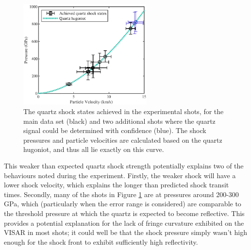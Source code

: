 \begin{figure} [h]
\begin{centering}
\includegraphics[width=0.6\textwidth]{figures/Experiment/QuartzShockStates_edit.eps}%
\caption{\label{fig:QuartzShockStates} The quartz shock states achieved in the experimental shots, for the main data set (black) and two additional shots where the quartz signal could be determined with confidence (blue). The shock pressures and particle velocities are calculated based on the quartz hugoniot, and thus all lie exactly on this curve.}
\end{centering}
\end{figure}

This weaker than expected quartz shock strength potentially explains two of the behaviours noted during the experiment. Firstly, the weaker shock will have a lower shock velocity, which explains the longer than predicted shock transit times. Secondly,  many of the shots in Figure \ref{fig:QuartzShockStates} are at pressures around 200-300 GPa, which (particularly when the error range is considered) are comparable to the threshold pressure at which the quartz is expected to become reflective. This provides a potential explanation for the lack of fringe curvature exhibited on the VISAR in most shots; it could well be that the shock pressure simply wasn't high enough for the shock front to exhibit sufficiently high reflectivity. 

